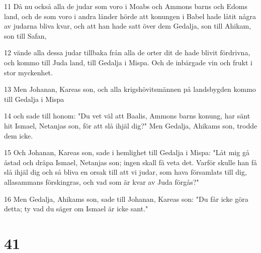 \par 11 Då nu också alla de judar som voro i Moabs och Ammons barns och Edoms land, och de som voro i andra länder hörde att konungen i Babel hade låtit några av judarna bliva kvar, och att han hade satt över dem Gedalja, son till Ahikam, son till Safan,
\par 12 vände alla dessa judar tillbaka från alla de orter dit de hade blivit fördrivna, och kommo till Juda land, till Gedalja i Mispa. Och de inbärgade vin och frukt i stor myckenhet.
\par 13 Men Johanan, Kareas son, och alla krigshövitsmännen på landsbygden kommo till Gedalja i Mispa
\par 14 och sade till honom: "Du vet väl att Baalis, Ammons barns konung, har sänt hit Ismael, Netanjas son, för att slå ihjäl dig?" Men Gedalja, Ahikams son, trodde dem icke.
\par 15 Och Johanan, Kareas son, sade i hemlighet till Gedalja i Mispa: "Låt mig gå åstad och dräpa Ismael, Netanjas son; ingen skall få veta det. Varför skulle han få slå ihjäl dig och så bliva en orsak till att vi judar, som hava församlats till dig, allasammans förskingras, och vad som är kvar av Juda förgås?"
\par 16 Men Gedalja, Ahikams son, sade till Johanan, Kareas son: "Du får icke göra detta; ty vad du säger om Ismael är icke sant."

\chapter{41}

